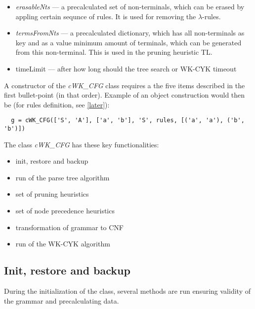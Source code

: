 \begin{itemize}
  \item{\textit{erasableNts} --- a precalculated set of non-terminals, which can be erased by appling certain sequnce of rules. It is used for removing the $\lambda$-rules.}

  \item{\textit{termsFromNts} --- a precalculated dictionary, which has all non-terminals as key and as a value minimum amount of terminals, which can be generated from this non-terminal. This is used in the pruning heuristic TL.}

  \item{timeLimit --- after how long should the tree search or WK-CYK timeout}
\end{itemize}

A constructor of the \textit{cWK\_CFG} class requires a the five items described in the first bullet-point (in that order). Example of an object construction would then be (for rules definition, see \ref{later}):
\begin{verbatim}
  g = cWK_CFG(['S', 'A'], ['a', 'b'], 'S', rules, [('a', 'a'), ('b', 'b')])
\end{verbatim}

\bigskip
The class \textit{cWK\_CFG} has these key functionalities:
\begin{itemize}
  \item{init, restore and backup}
  \item{run of the parse tree algorithm}
  \item{set of pruning heuristics}
  \item{set of node precedence heuristics}
  \item{transformation of grammar to CNF}
  \item{run of the WK-CYK algorithm}
\end{itemize}

\subsection{Init, restore and backup}
During the initialization of the class, several methods are run ensuring validity of the grammar and precalculating data.

